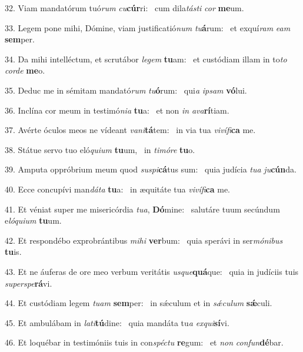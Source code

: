 32. Viam mandatórum tuó\textit{rum} \textit{cu}\textbf{cúr}ri: \ast\  cum dila\textit{tás}\textit{ti} \textit{cor} \textbf{me}um.\

33. Legem pone mihi, Dómine, viam justificatió\textit{num} \textit{tu}\textbf{á}rum: \ast\  et exquí\textit{ram} \textit{e}\textit{am} \textbf{sem}per.\

34. Da mihi intelléctum, et scrutábor \textit{le}\textit{gem} \textbf{tu}am: \ast\  et custódiam illam in to\textit{to} \textit{cor}\textit{de} \textbf{me}o.\

35. Deduc me in sémitam mandató\textit{rum} \textit{tu}\textbf{ó}rum: \ast\  qui\textit{a} \textit{ip}\textit{sam} \textbf{vó}lui.\

36. Inclína cor meum in testimó\textit{ni}\textit{a} \textbf{tu}a: \ast\  et non \textit{in} \textit{a}\textit{va}\textbf{rí}tiam.\

37. Avérte óculos meos ne vídeant \textit{va}\textit{ni}\textbf{tá}tem: \ast\  in via tua \textit{vi}\textit{ví}\textit{fi}\textbf{ca} me.\

38. Státue servo tuo eló\textit{qui}\textit{um} \textbf{tu}um, \ast\  in \textit{ti}\textit{mó}\textit{re} \textbf{tu}o.\

39. Amputa oppróbrium meum quod \textit{su}\textit{spi}\textbf{cá}tus sum: \ast\  quia judícia \textit{tu}\textit{a} \textit{ju}\textbf{cún}da.\

40. Ecce concupívi man\textit{dá}\textit{ta} \textbf{tu}a: \ast\  in æquitáte tua \textit{vi}\textit{ví}\textit{fi}\textbf{ca} me.\

41. Et véniat super me misericórdia \textit{tu}\textit{a}, \textbf{Dó}mine: \ast\  salutáre tuum secúndum e\textit{ló}\textit{qui}\textit{um} \textbf{tu}um.\

42. Et respondébo exprobrántibus \textit{mi}\textit{hi} \textbf{ver}bum: \ast\  quia sperávi in ser\textit{mó}\textit{ni}\textit{bus} \textbf{tu}is.\

43. Et ne áuferas de ore meo verbum veritátis \textit{us}\textit{que}\textbf{quá}que: \ast\  quia in judíciis tuis \textit{su}\textit{per}\textit{spe}\textbf{rá}vi.\

44. Et custódiam legem \textit{tu}\textit{am} \textbf{sem}per: \ast\  in sǽculum et in \textit{sǽ}\textit{cu}\textit{lum} \textbf{sǽ}culi.\

45. Et ambulábam in \textit{la}\textit{ti}\textbf{tú}dine: \ast\  quia mandáta tu\textit{a} \textit{ex}\textit{qui}\textbf{sí}vi.\

46. Et loquébar in testimóniis tuis in con\textit{spéc}\textit{tu} \textbf{re}gum: \ast\  et \textit{non} \textit{con}\textit{fun}\textbf{dé}bar.\

